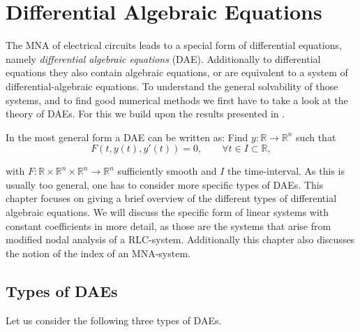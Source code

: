\chapter{Differential Algebraic Equations}

\label{sec:Differential Algebraic equations}

The MNA of electrical circuits leads to a special form of differential equations, namely \emph{differential algebraic equations} (DAE). Additionally to differential equations they also contain algebraic equations, or are equivalent to a system of differential-algebraic equations. 
To understand the general solvability of those systems, and to find good numerical methods we first have to take a look at the theory of DAEs. For this we build upon the results presented in \cite{NumerikGewöhnlicherDifferentialgleichungen}.

In the most general form a DAE can be written as:
Find $y:\mathbb{R} \to \mathbb{R}^n$ such that
\begin{equation}
	\label{Abstract_DAE}
	F(t, y(t), y'(t)) = 0, \qquad \forall t \in I \subset \mathbb{R},
\end{equation}

with $F:\mathbb{R} \times \mathbb{R}^n \times \mathbb{R}^n \to \mathbb{R}^n$ sufficiently smooth and $I$ the time-interval. As this is usually too general, one has to consider more specific types of DAEs.
This chapter focuses on giving a brief overview of the different types of differential algebraic equations. We will discuss the specific form of linear systems with constant coefficients in more detail, as those are the systems that arise from modified nodal analysis of a RLC-system. Additionally this chapter also discusses the notion of the index of an MNA-system.

\section{Types of DAEs}

	Let us consider the following three types of DAEs.
	
